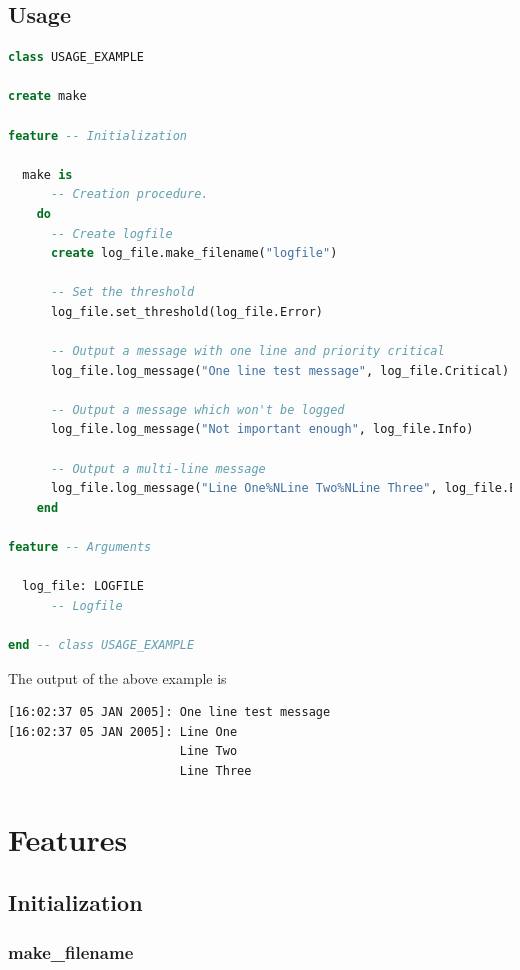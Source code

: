 \documentclass[a4paper,fleqn]{report}
\begin{document}
\section{Usage}
\label{sec:usage}

\begin{lstlisting}[language=Eiffel]
class USAGE_EXAMPLE

create make

feature -- Initialization

  make is
      -- Creation procedure.
    do                  
      -- Create logfile
      create log_file.make_filename("logfile")

      -- Set the threshold
      log_file.set_threshold(log_file.Error)
                        
      -- Output a message with one line and priority critical
      log_file.log_message("One line test message", log_file.Critical)

      -- Output a message which won't be logged
      log_file.log_message("Not important enough", log_file.Info)

      -- Output a multi-line message
      log_file.log_message("Line One%NLine Two%NLine Three", log_file.Error)
    end
                
feature -- Arguments

  log_file: LOGFILE
      -- Logfile
        
end -- class USAGE_EXAMPLE
\end{lstlisting}

The output of the above example is

\begin{lstlisting}
[16:02:37 05 JAN 2005]: One line test message
[16:02:37 05 JAN 2005]: Line One
                        Line Two
                        Line Three
\end{lstlisting}


\chapter{Features}
\label{cha:features}


\section{Initialization}
\label{sec:initialization}


\subsection{make\_filename}
\label{sec:make_filename}
\end{document}
